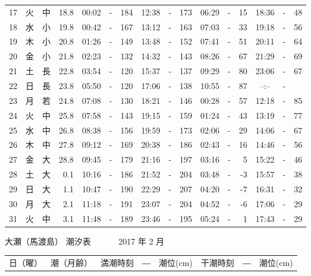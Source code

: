 \documentclass[12pt.a4j]{jsarticle}
\begin{document}
\begin{center}
\begin{table}[ht]
\begin{tabular}{|rc|cr|ccrccr|ccrccr|}
17 & 火 & 中 & 18.8 &  00:02 &-& 184  &  12:38 &-& 173  &   06:29 &-&  15  &   18:36 &-&  48  \\
18 & 水 & 小 & 19.8 &  00:42 &-& 167  &  13:12 &-& 163  &   07:03 &-&  33  &   19:18 &-&  56  \\
19 & 木 & 小 & 20.8 &  01:26 &-& 149  &  13:48 &-& 152  &   07:41 &-&  51  &   20:11 &-&  64  \\
20 & 金 & 小 & 21.8 &  02:23 &-& 132  &  14:32 &-& 143  &   08:26 &-&  67  &   21:29 &-&  69  \\
21 & 土 & 長 & 22.8 &  03:54 &-& 120  &  15:37 &-& 137  &   09:29 &-&  80  &   23:06 &-&  67  \\
22 & 日 & 長 & 23.8 &  05:50 &-& 120  &  17:06 &-& 138  &   10:55 &-&  87  &   --:-- &-&     \\
23 & 月 & 若 & 24.8 &  07:08 &-& 130  &  18:21 &-& 146  &   00:28 &-&  57  &   12:18 &-&  85  \\
24 & 火 & 中 & 25.8 &  07:58 &-& 143  &  19:15 &-& 159  &   01:24 &-&  43  &   13:19 &-&  77  \\
25 & 水 & 中 & 26.8 &  08:38 &-& 156  &  19:59 &-& 173  &   02:06 &-&  29  &   14:06 &-&  67  \\
26 & 木 & 中 & 27.8 &  09:12 &-& 169  &  20:38 &-& 186  &   02:43 &-&  16  &   14:46 &-&  56  \\
27 & 金 & 大 & 28.8 &  09:45 &-& 179  &  21:16 &-& 197  &   03:16 &-&   5  &   15:22 &-&  46  \\
28 & 土 & 大 &  0.1 &  10:16 &-& 186  &  21:52 &-& 204  &   03:48 &-&  -3  &   15:57 &-&  38  \\
29 & 日 & 大 &  1.1 &  10:47 &-& 190  &  22:29 &-& 207  &   04:20 &-&  -7  &   16:31 &-&  32  \\
30 & 月 & 大 &  2.1 &  11:18 &-& 191  &  23:07 &-& 204  &   04:52 &-&  -6  &   17:06 &-&  29  \\
31 & 火 & 中 &  3.1 &  11:48 &-& 189  &  23:46 &-& 195  &   05:24 &-&   1  &   17:43 &-&  29  \\
   \hline
   \end{tabular}
\end{table}
\newpage
 {\LARGE 大瀬（馬渡島）  潮汐表　　　}
 {\large 2017 年  2 月}\\
 \begin{table}[ht]
    \begin{tabular}{|rc|cr|ccrccr|ccrccr|}
    \hline
    \multicolumn{2}{|c|}{日（曜）} & \multicolumn{2}{c|}{潮（月齢）} & \multicolumn{6}{c|}{満潮時刻　―　潮位(cm)} & \multicolumn{6}{c|}{干潮時刻　―　潮位(cm)} \\

\end{tabular}
\end{table}
\end{center}
\end{document}
